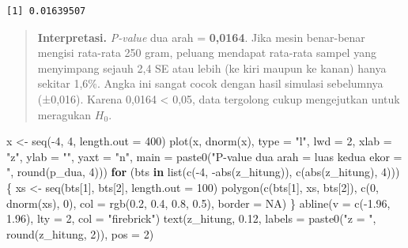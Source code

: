 \documentclass[
  indonesian,
  letterpaper,
]{book}
\newenvironment{Shaded}{\begin{snugshade}}{\end{snugshade}}
\newcommand{\AttributeTok}[1]{\textcolor[rgb]{0.40,0.45,0.13}{#1}}
\newcommand{\ConstantTok}[1]{\textcolor[rgb]{0.56,0.35,0.01}{#1}}
\newcommand{\ControlFlowTok}[1]{\textcolor[rgb]{0.00,0.23,0.31}{\textbf{#1}}}
\newcommand{\DecValTok}[1]{\textcolor[rgb]{0.68,0.00,0.00}{#1}}
\newcommand{\FloatTok}[1]{\textcolor[rgb]{0.68,0.00,0.00}{#1}}
\newcommand{\FunctionTok}[1]{\textcolor[rgb]{0.28,0.35,0.67}{#1}}
\newcommand{\NormalTok}[1]{\textcolor[rgb]{0.00,0.23,0.31}{#1}}
\newcommand{\OtherTok}[1]{\textcolor[rgb]{0.00,0.23,0.31}{#1}}
\newcommand{\SpecialCharTok}[1]{\textcolor[rgb]{0.37,0.37,0.37}{#1}}
\newcommand{\StringTok}[1]{\textcolor[rgb]{0.13,0.47,0.30}{#1}}
\begin{document}
\begin{verbatim}
[1] 0.01639507
\end{verbatim}

\begin{quote}
\textbf{Interpretasi.} \emph{P-value} dua arah = \textbf{0,0164}. Jika
mesin benar-benar mengisi rata-rata 250 gram, peluang mendapat rata-rata
sampel yang menyimpang sejauh 2,4 SE atau lebih (ke kiri maupun ke
kanan) hanya sekitar 1,6\%. Angka ini sangat cocok dengan hasil simulasi
sebelumnya (±0,016). Karena 0,0164 \textless{} 0,05, data tergolong
cukup mengejutkan untuk meragukan \(H_0\).
\end{quote}

\begin{Shaded}
\begin{Highlighting}[]
\NormalTok{x }\OtherTok{\textless{}{-}} \FunctionTok{seq}\NormalTok{(}\SpecialCharTok{{-}}\DecValTok{4}\NormalTok{, }\DecValTok{4}\NormalTok{, }\AttributeTok{length.out =} \DecValTok{400}\NormalTok{)}
\FunctionTok{plot}\NormalTok{(x, }\FunctionTok{dnorm}\NormalTok{(x), }\AttributeTok{type =} \StringTok{"l"}\NormalTok{, }\AttributeTok{lwd =} \DecValTok{2}\NormalTok{, }\AttributeTok{xlab =} \StringTok{"z"}\NormalTok{, }\AttributeTok{ylab =} \StringTok{""}\NormalTok{, }\AttributeTok{yaxt =} \StringTok{"n"}\NormalTok{,}
     \AttributeTok{main =} \FunctionTok{paste0}\NormalTok{(}\StringTok{"P{-}value dua arah = luas kedua ekor = "}\NormalTok{, }\FunctionTok{round}\NormalTok{(p\_dua, }\DecValTok{4}\NormalTok{)))}
\ControlFlowTok{for}\NormalTok{ (bts }\ControlFlowTok{in} \FunctionTok{list}\NormalTok{(}\FunctionTok{c}\NormalTok{(}\SpecialCharTok{{-}}\DecValTok{4}\NormalTok{, }\SpecialCharTok{{-}}\FunctionTok{abs}\NormalTok{(z\_hitung)), }\FunctionTok{c}\NormalTok{(}\FunctionTok{abs}\NormalTok{(z\_hitung), }\DecValTok{4}\NormalTok{))) \{}
\NormalTok{  xs }\OtherTok{\textless{}{-}} \FunctionTok{seq}\NormalTok{(bts[}\DecValTok{1}\NormalTok{], bts[}\DecValTok{2}\NormalTok{], }\AttributeTok{length.out =} \DecValTok{100}\NormalTok{)}
  \FunctionTok{polygon}\NormalTok{(}\FunctionTok{c}\NormalTok{(bts[}\DecValTok{1}\NormalTok{], xs, bts[}\DecValTok{2}\NormalTok{]), }\FunctionTok{c}\NormalTok{(}\DecValTok{0}\NormalTok{, }\FunctionTok{dnorm}\NormalTok{(xs), }\DecValTok{0}\NormalTok{), }\AttributeTok{col =} \FunctionTok{rgb}\NormalTok{(}\FloatTok{0.2}\NormalTok{, }\FloatTok{0.4}\NormalTok{, }\FloatTok{0.8}\NormalTok{, }\FloatTok{0.5}\NormalTok{), }\AttributeTok{border =} \ConstantTok{NA}\NormalTok{)}
\NormalTok{\}}
\FunctionTok{abline}\NormalTok{(}\AttributeTok{v =} \FunctionTok{c}\NormalTok{(}\SpecialCharTok{{-}}\FloatTok{1.96}\NormalTok{, }\FloatTok{1.96}\NormalTok{), }\AttributeTok{lty =} \DecValTok{2}\NormalTok{, }\AttributeTok{col =} \StringTok{"firebrick"}\NormalTok{)}
\FunctionTok{text}\NormalTok{(z\_hitung, }\FloatTok{0.12}\NormalTok{, }\AttributeTok{labels =} \FunctionTok{paste0}\NormalTok{(}\StringTok{"z = "}\NormalTok{, }\FunctionTok{round}\NormalTok{(z\_hitung, }\DecValTok{2}\NormalTok{)), }\AttributeTok{pos =} \DecValTok{2}\NormalTok{)}
\end{Highlighting}
\end{Shaded}
\end{document}
